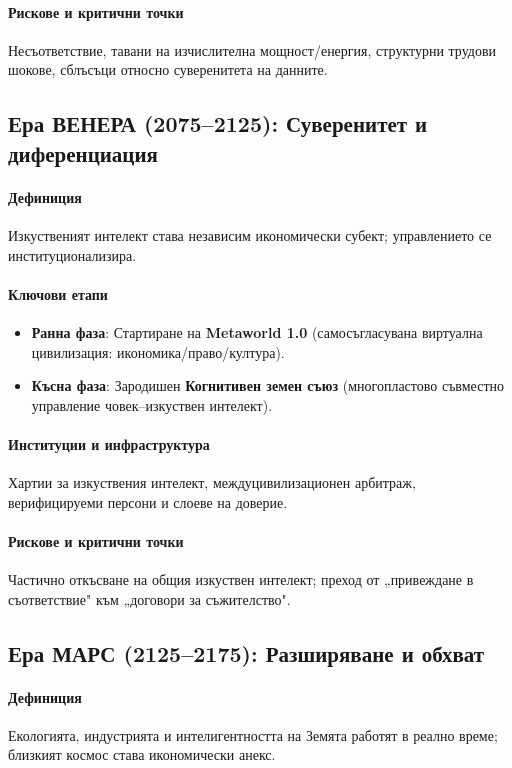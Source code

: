 \documentclass[11pt]{article}
\begin{document}
\paragraph{Рискове и критични точки} Несъответствие, тавани на изчислителна мощност/енергия, структурни трудови шокове, сблъсъци относно суверенитета на данните.

\subsection{Ера ВЕНЕРА (2075–2125): Суверенитет и диференциация}
\paragraph{Дефиниция} Изкуственият интелект става независим икономически субект; управлението се институционализира.

\paragraph{Ключови етапи}
\begin{itemize}[noitemsep]
  \item \textbf{Ранна фаза}: Стартиране на \textbf{Metaworld 1.0} (самосъгласувана виртуална цивилизация: икономика/право/култура).
  \item \textbf{Късна фаза}: Зародишен \textbf{Когнитивен земен съюз} (многопластово съвместно управление човек–изкуствен интелект).
\end{itemize}

\paragraph{Институции и инфраструктура} Хартии за изкуствения интелект, междуцивилизационен арбитраж, верифицируеми персони и слоеве на доверие.

\paragraph{Рискове и критични точки} Частично откъсване на общия изкуствен интелект; преход от „привеждане в съответствие" към „договори за съжителство".

\subsection{Ера МАРС (2125–2175): Разширяване и обхват}
\paragraph{Дефиниция} Екологията, индустрията и интелигентността на Земята работят в реално време; близкият космос става икономически анекс.
\end{document}
